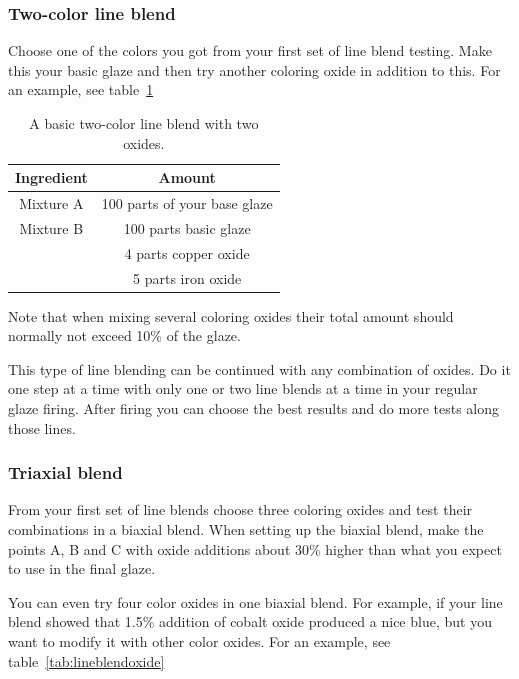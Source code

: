 \subsubsection{Two-color line blend}
Choose one of the colors you got from your first set of line blend testing. 
Make this your basic glaze and then try another coloring oxide in addition to 
this.
For an example, see table~\ref{tab:lineblendtwo}
\begin{center}
  \renewcommand{\arraystretch}{1.5}
  \begin{table}\centering
    \begin{tabular}{|c|c|}\hline
      \textbf{Ingredient}&\textbf{Amount}\\\hline\hline
      Mixture A&100 parts of your base glaze\\\hline
      Mixture B&100 parts basic glaze\\\cline{2-2}
      &4 parts copper oxide\\\cline{2-2}
      &5 parts iron oxide\\\hline
    \end{tabular}
    \caption{A basic two-color line blend with two oxides.}
    \label{tab:lineblendtwo}
  \end{table}
\end{center}
Note that when mixing several coloring oxides their total amount should 
normally not exceed 10\% of the glaze.

This type of line blending can be continued with any combination of oxides. Do 
it one step at a time with only one or two line blends at a time in your 
regular glaze firing. After firing you can choose the best results and do more 
tests along those lines.
\subsubsection{Triaxial blend}
From your first set of line blends choose three coloring oxides and test their 
combinations in a biaxial blend. When setting up the biaxial blend, make the 
points A, B and C with oxide additions about 30\% higher than what you expect 
to use in the final glaze.

You can even try four color oxides in one biaxial blend. For example, if your 
line blend showed that 1.5\% addition of cobalt oxide produced a nice blue, but 
you want to modify it with other color oxides. For an example, see 
table~\ref{tab:lineblendoxide}

